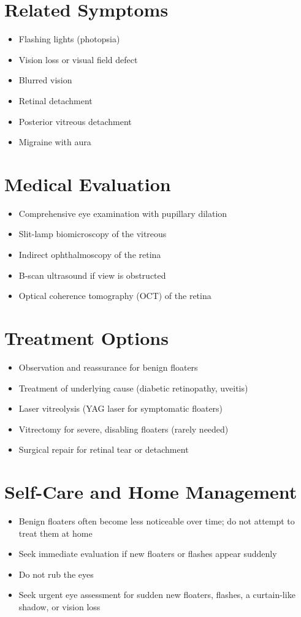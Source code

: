 \section*{Related Symptoms}
\begin{itemize}
\item Flashing lights (photopsia)
\item Vision loss or visual field defect
\item Blurred vision
\item Retinal detachment
\item Posterior vitreous detachment
\item Migraine with aura
\end{itemize}

\section*{Medical Evaluation}
\begin{itemize}
\item Comprehensive eye examination with pupillary dilation
\item Slit-lamp biomicroscopy of the vitreous
\item Indirect ophthalmoscopy of the retina
\item B-scan ultrasound if view is obstructed
\item Optical coherence tomography (OCT) of the retina
\end{itemize}

\section*{Treatment Options}
\begin{itemize}
\item Observation and reassurance for benign floaters
\item Treatment of underlying cause (diabetic retinopathy, uveitis)
\item Laser vitreolysis (YAG laser for symptomatic floaters)
\item Vitrectomy for severe, disabling floaters (rarely needed)
\item Surgical repair for retinal tear or detachment
\end{itemize}
\section*{Self-Care and Home Management}
\begin{itemize}
\item Benign floaters often become less noticeable over time; do not attempt to treat them at home
\item Seek immediate evaluation if new floaters or flashes appear suddenly
\item Do not rub the eyes
\item Seek urgent eye assessment for sudden new floaters, flashes, a curtain-like shadow, or vision loss
\end{itemize}

